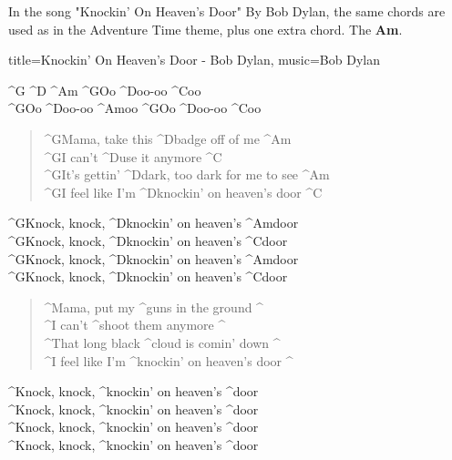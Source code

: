 \newpage

In the song "Knockin' On Heaven's Door" By Bob Dylan, the same chords are used as in the Adventure Time theme, plus one extra chord. The \textbf{Am}.

\begin{song}[verse/numbered, remember-chords, align-chords=l]{title={Knockin' On Heaven's Door - Bob Dylan}, music={Bob Dylan}}
	\begin{intro}	
		^{G}   ^{D}      ^{Am}     ^{G}Oo ^{D}oo-oo ^{C}oo \\
		^{G}Oo ^{D}oo-oo ^{Am}oo   ^{G}Oo ^{D}oo-oo ^{C}oo \\
	\end{intro}
	\begin{verse}
		^{G}Mama, take this ^{D}badge off of me ^{Am} \\
		^{G}I can’t ^{D}use it anymore ^{C} \\
		^{G}It’s gettin’ ^{D}dark, too dark for me to see ^{Am} \\
		^{G}I feel like I’m ^{D}knockin’ on heaven’s door ^{C} \\
	\end{verse}
	\begin{chorus}
		^{G}Knock, knock, ^{D}knockin’ on heaven’s ^{Am}door \\
		^{G}Knock, knock, ^{D}knockin’ on heaven’s ^{C}door \\
		^{G}Knock, knock, ^{D}knockin’ on heaven’s ^{Am}door \\
		^{G}Knock, knock, ^{D}knockin’ on heaven’s ^{C}door \\
	\end{chorus}
	\begin{verse}
		^Mama, put my ^guns in the ground ^ {} \\
		^I can’t ^shoot them anymore ^ {} \\
		^That long black ^cloud is comin’ down ^ {} \\
		^I feel like I’m ^knockin’ on heaven’s door ^ {} \\
	\end{verse}
	\begin{chorus}
		^Knock, knock, ^knockin’ on heaven’s ^door \\
		^Knock, knock, ^knockin’ on heaven’s ^door \\
		^Knock, knock, ^knockin’ on heaven’s ^door \\
		^Knock, knock, ^knockin’ on heaven’s ^door \\
	\end{chorus}
\end{song}

